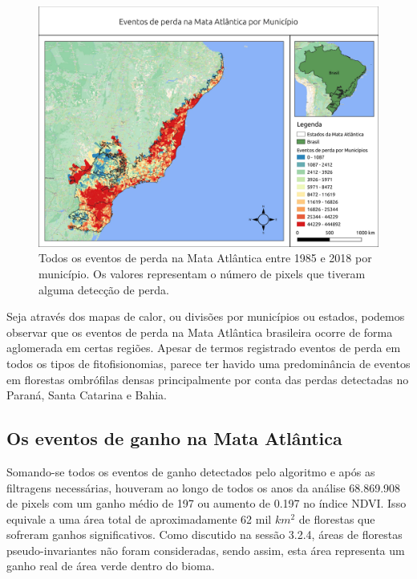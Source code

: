 \begin{figure}[H]
    \centering
    \includegraphics[scale=.5]{images/mun_loss_mun_masked85_maskedgain.pdf}
    \caption{Todos os eventos de perda na Mata Atlântica entre 1985 e 2018 por município. Os valores representam o número de pixels que tiveram alguma detecção de perda.}
    \label{fig:mun_loss_masked85_maskedgain}
\end{figure}

Seja através dos mapas de calor, ou divisões por municípios ou estados, podemos observar que os eventos de perda na Mata Atlântica brasileira ocorre de forma aglomerada em certas regiões. Apesar de termos registrado eventos de perda em todos os tipos de fitofisionomias, parece ter havido uma predominância de eventos em florestas ombrófilas densas principalmente por conta das perdas detectadas no Paraná, Santa Catarina e Bahia.

\subsection{Os eventos de ganho na Mata Atlântica}

\hspace{13pt} Somando-se todos os eventos de ganho detectados pelo algoritmo e após as filtragens necessárias, houveram ao longo de todos os anos da análise 68.869.908 de pixels com um ganho médio de 197 ou aumento de 0.197 no índice NDVI. Isso equivale a uma área total de aproximadamente 62 mil $ km^2 $ de florestas que sofreram ganhos significativos. Como discutido na sessão 3.2.4, áreas de florestas pseudo-invariantes não foram consideradas, sendo assim, esta área representa um ganho real de área verde dentro do bioma. 

